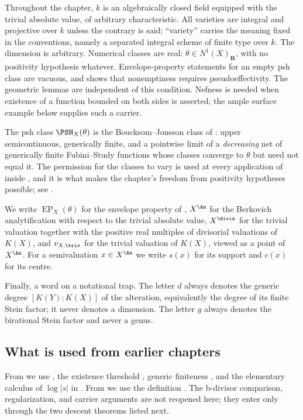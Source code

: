 Throughout the chapter, $k$ is an algebraically closed field equipped with
the trivial absolute value, of arbitrary characteristic.  All varieties are
integral and projective over $k$ unless the contrary is said; ``variety''
carries the meaning fixed in the conventions, namely a separated integral
scheme of finite type over $k$.  The dimension is arbitrary.  Numerical
classes are real: $\theta\in N^1(X)_{\mathbf R}$, with no positivity
hypothesis whatever.  Envelope-property statements for an empty psh class are vacuous,
and  shows that nonemptiness requires
pseudoeffectivity.  The geometric lemmas are independent of this condition.
Nefness is needed when existence of a function bounded on both sides
is asserted; the ample surface example below supplies such a carrier.

The psh class $\PSH_X(\theta)$ is the Boucksom--Jonsson class of
: upper semicontinuous, generically finite, and a pointwise
limit of a \emph{decreasing} net of generically finite Fubini--Study
functions whose classes converge to $\theta$ but need not equal it.  The
permission for the classes to vary is used at every application of
 inside
, and it is what makes the chapter's freedom
from positivity hypotheses possible; see
.

We write $\operatorname{EP}_X(\theta)$ for the envelope property of
, $X^{\An}$ for the Berkovich
analytification with respect to the trivial absolute value, $X^{\divis}$
for the trivial valuation together with the positive real multiples of
divisorial valuations of $K(X)$, and $v_{X,\triv}$ for the trivial
valuation of $K(X)$, viewed as a point of $X^{\An}$.  For a semivaluation
$x\in X^{\An}$ we write $s(x)$ for its support and $c(x)$ for its
centre.

Finally, a word on a notational trap.  The letter $d$ always denotes the
generic degree $[K(Y):K(X)]$ of the alteration, equivalently the degree of
its finite Stein factor; it never denotes a dimension.  The letter $g$
always denotes the birational Stein factor and never a genus.

\subsection{What is used from earlier chapters}
\label{sec:ch42-dependencies}

From  we use , the existence
threshold , generic finiteness
, and the elementary calculus of
$\log|s|$ in .  From
 we use the definition
.  The b-divisor comparison,
regularization, and carrier arguments are not reopened here; they enter only
through the two descent theorems listed next.


